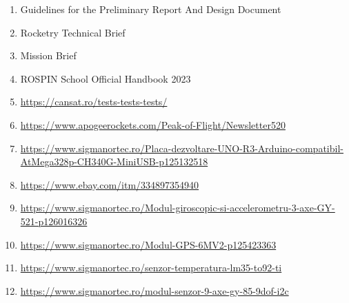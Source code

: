 \begin{enumerate}
    \item Guidelines for the Preliminary Report And Design Document
    \item Rocketry Technical Brief
    \item Mission Brief
    \item ROSPIN School Official Handbook 2023
    \item \url{https://cansat.ro/tests-tests-tests/}
    \item \url{https://www.apogeerockets.com/Peak-of-Flight/Newsletter520}
    \item \url{https://www.sigmanortec.ro/Placa-dezvoltare-UNO-R3-Arduino-compatibil-AtMega328p-CH340G-MiniUSB-p125132518}
    \item \url{https://www.ebay.com/itm/334897354940}
    \item \url{https://www.sigmanortec.ro/Modul-giroscopic-si-accelerometru-3-axe-GY-521-p126016326}
    \item \url{https://www.sigmanortec.ro/Modul-GPS-6MV2-p125423363}
    \item \url{https://www.sigmanortec.ro/senzor-temperatura-lm35-to92-ti}
    \item \url{https://www.sigmanortec.ro/modul-senzor-9-axe-gy-85-9dof-i2c}
\end{enumerate}

